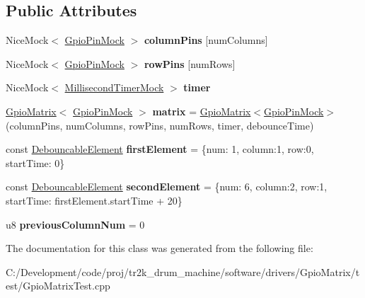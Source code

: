 \subsection*{Public Attributes}
\begin{DoxyCompactItemize}
\item 
\mbox{\label{class_gpio_matrix_test_a106753c8af35abce96e9eeae4ce3d89e}} 
Nice\+Mock$<$ \mbox{\hyperlink{class_gpio_pin_mock}{Gpio\+Pin\+Mock}} $>$ {\bfseries column\+Pins} \mbox{[}num\+Columns\mbox{]}
\item 
\mbox{\label{class_gpio_matrix_test_adda14c7f120ca19100db925ed17def64}} 
Nice\+Mock$<$ \mbox{\hyperlink{class_gpio_pin_mock}{Gpio\+Pin\+Mock}} $>$ {\bfseries row\+Pins} \mbox{[}num\+Rows\mbox{]}
\item 
\mbox{\label{class_gpio_matrix_test_a4ae932aba340e35f97f241349454ebe2}} 
Nice\+Mock$<$ \mbox{\hyperlink{class_millisecond_timer_mock}{Millisecond\+Timer\+Mock}} $>$ {\bfseries timer}
\item 
\mbox{\label{class_gpio_matrix_test_ad26a7a03742d6d4f2674f11888e87bb6}} 
\mbox{\hyperlink{class_gpio_matrix}{Gpio\+Matrix}}$<$ \mbox{\hyperlink{class_gpio_pin_mock}{Gpio\+Pin\+Mock}} $>$ {\bfseries matrix} = \mbox{\hyperlink{class_gpio_matrix}{Gpio\+Matrix}}$<$\mbox{\hyperlink{class_gpio_pin_mock}{Gpio\+Pin\+Mock}}$>$(column\+Pins, num\+Columns, row\+Pins, num\+Rows, timer, debounce\+Time)
\item 
\mbox{\label{class_gpio_matrix_test_a132450300e7274a50bb9f9df9e371146}} 
const \mbox{\hyperlink{struct_debouncable_element}{Debouncable\+Element}} {\bfseries first\+Element} = \{num\+: 1, column\+:1, row\+:0, start\+Time\+: 0\}
\item 
\mbox{\label{class_gpio_matrix_test_a902ab640e876d24907aefb8a1fe0d24e}} 
const \mbox{\hyperlink{struct_debouncable_element}{Debouncable\+Element}} {\bfseries second\+Element} = \{num\+: 6, column\+:2, row\+:1, start\+Time\+: first\+Element.\+start\+Time + 20\}
\item 
\mbox{\label{class_gpio_matrix_test_ab9d97ffb7d3abf348a62c6037d65c84a}} 
u8 {\bfseries previous\+Column\+Num} = 0
\end{DoxyCompactItemize}


The documentation for this class was generated from the following file\+:\begin{DoxyCompactItemize}
\item 
C\+:/\+Development/code/proj/tr2k\+\_\+drum\+\_\+machine/software/drivers/\+Gpio\+Matrix/test/Gpio\+Matrix\+Test.\+cpp\end{DoxyCompactItemize}
